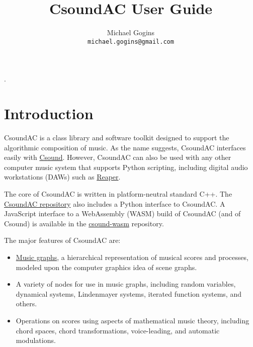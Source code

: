 \documentclass[letterpaper,10pt,DIV=12]{scrartcl}
\begin{document}
.

\title{CsoundAC User Guide}
\author{Michael Gogins \\ \texttt{michael.gogins@gmail.com}}
\maketitle

\section{Introduction}

CsoundAC is a class library and software toolkit designed to support the algorithmic composition of music. As the name suggests, CsoundAC interfaces easily with \href{https://csound.com/}{ Csound}. However, CsoundAC can also be used with any other computer music system that supports Python scripting, including digital audio workstations (DAWs) such as \href{https://www.reaper.fm/}{Reaper}.

The core of CsoundAC is written in platform-neutral standard C++. The \href{https://github.com/gogins/csound-ac}{CsoundAC repository} also includes a Python interface to CsoundAC. A JavaScript interface to a WebAssembly (WASM) build of CsoundAC (and of Csound) is available in the \href{https://github.com/gogins/csound-wasm}{csound-wasm} repository. 

The major features of CsoundAC are:

\begin{itemize}
\item  \href{https://quod.lib.umich.edu/i/icmc/bbp2372.1998.298/1}{Music graphs}, a hierarchical representation of musical scores and processes, modeled upon the computer graphics idea of scene graphs. 

\item A variety of nodes for use in music graphs, including random variables, dynamical systems, Lindenmayer systems, iterated function systems, and others.

\item Operations on scores using aspects of mathematical music theory, including chord spaces, chord transformations, voice-leading, and automatic modulations. 
\end{itemize}
\end{document}
